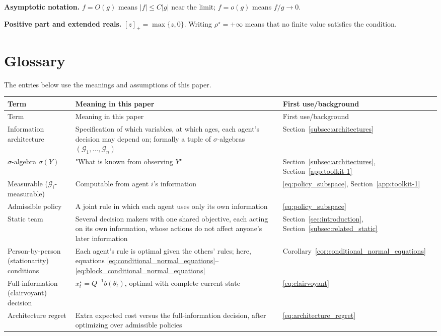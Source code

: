 \textbf{Asymptotic notation.} $f=O(g)$ means $|f|\le C|g|$ near the limit; $f=o(g)$ means $f/g\to0$.

\textbf{Positive part and extended reals.} $[z]_+=\max\{z,0\}$. Writing $\rho^\star=+\infty$ means that no finite value satisfies the condition.

\clearpage
\section{Glossary}
\label{app:glossary}
The entries below use the meanings and assumptions of this paper.
\small
\setlength{\tabcolsep}{4pt}
\renewcommand{\arraystretch}{1.12}
\begin{longtable}{@{}p{.23\linewidth}p{.52\linewidth}p{.20\linewidth}@{}}
\toprule
Term & Meaning in this paper & First use/background \\
\midrule
\endfirsthead
\toprule
Term & Meaning in this paper & First use/background \\
\midrule
\endhead
\bottomrule
\endfoot
Information architecture & Specification of which variables, at which ages, each agent's decision may depend on; formally a tuple of $\sigma$-algebras $(\mathcal G_1,\dots,\mathcal G_n)$ & Section~\ref{subsec:architectures} \\
$\sigma$-algebra $\sigma(Y)$ & "What is known from observing $Y$" & Section~\ref{subsec:architectures}, Section~\ref{app:toolkit-1} \\
Measurable ($\mathcal G_i$-measurable) & Computable from agent $i$'s information & \eqref{eq:policy_subspace}, Section~\ref{app:toolkit-1} \\
Admissible policy & A joint rule in which each agent uses only its own information & \eqref{eq:policy_subspace} \\
Static team & Several decision makers with one shared objective, each acting on its own information, whose actions do not affect anyone's later information & Section~\ref{sec:introduction}, Section~\ref{subsec:related_static} \\
Person-by-person (stationarity) conditions & Each agent's rule is optimal given the others' rules; here, equations \eqref{eq:conditional_normal_equations}--\eqref{eq:block_conditional_normal_equations} & Corollary~\ref{cor:conditional_normal_equations} \\
Full-information (clairvoyant) decision & $x^\star_t=Q^{-1}b(\theta_t)$, optimal with complete current state & \eqref{eq:clairvoyant} \\
Architecture regret & Extra expected cost versus the full-information decision, after optimizing over admissible policies & \eqref{eq:architecture_regret} \\

\end{longtable}
